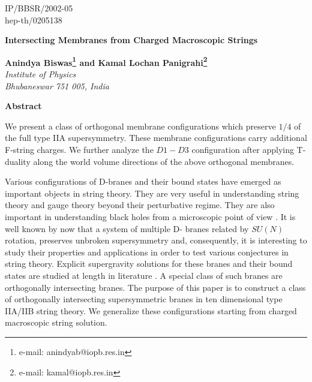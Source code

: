 \documentclass[a4paper,12pt,fleqn,cite,epsfig]{article}
\begin{document}
\topmargin 0pt
\oddsidemargin 0mm

\renewcommand{\thefootnote}{\fnsymbol{footnote}}
\begin{titlepage}
\begin{flushright}
IP/BBSR/2002-05\\
hep-th/0205138
\end{flushright}

\vspace{5mm}
\begin{center}
{\Large \bf Intersecting Membranes from Charged Macroscopic Strings}
\vspace{6mm}

{\bf Anindya Biswas\footnote{e-mail: anindyab@iopb.res.in} 
and Kamal Lochan Panigrahi\footnote{e-mail: kamal@iopb.res.in}}\\
\vspace{5mm}
{\em Institute of Physics\\ 
Bhubaneswar 751 005, India}\\
\vspace{3mm}


\end{center}
\vspace{5mm}
\centerline{{\bf{Abstract}}}
\vspace{5mm}
We present a class of orthogonal membrane configurations
which preserve $1/4$ of the full type IIA supersymmetry. 
These membrane configurations carry additional F-string charges.
We further analyze the $D1-D3$ configuration after applying T- duality 
along the world volume directions of the above orthogonal membranes.


\end{titlepage}
\newpage
Various configurations of D-branes and their bound
states \cite{witten,li,dougla,kamal1} have emerged as important objects 
in string theory. They are very useful in understanding 
string theory and gauge theory beyond their perturbative regime. 
They are also important in understanding black holes from 
a microscopic point of view \cite{maldacena}. It is well known 
by now that a system of multiple D- branes related by $SU(N)$ 
rotation, preserves unbroken supersymmetry \cite{douglas} and, 
consequently, it is interesting to study their properties and applications
in order to test various conjectures in string theory. Explicit 
supergravity solutions for these branes and their bound states 
are studied at length in literature \cite{myers,gaunt}. 
A special class of such 
branes are orthogonally intersecting branes. The purpose of this paper
is to construct a class of orthogonally intersecting supersymmetric
branes in ten dimensional type IIA/IIB string theory. We generalize these 
configurations starting from charged macroscopic string solution. 
\end{document}
